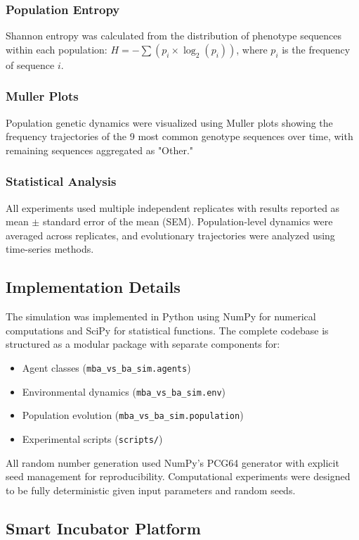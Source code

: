 \documentclass[aps,pre,twocolumn,floatfix,nofootinbib,amsmath,amssymb]{revtex4-2}
\begin{document}
\subsubsection{Population Entropy}
Shannon entropy was calculated from the distribution of phenotype sequences within each population: $H = -\sum(p_i \times \log_2(p_i))$, where $p_i$ is the frequency of sequence $i$.

\subsubsection{Muller Plots}
Population genetic dynamics were visualized using Muller plots showing the frequency trajectories of the 9 most common genotype sequences over time, with remaining sequences aggregated as "Other."

\subsubsection{Statistical Analysis}
All experiments used multiple independent replicates with results reported as mean $\pm$ standard error of the mean (SEM). Population-level dynamics were averaged across replicates, and evolutionary trajectories were analyzed using time-series methods.

\subsection{Implementation Details}

The simulation was implemented in Python using NumPy for numerical computations and SciPy for statistical functions. The complete codebase is structured as a modular package with separate components for:
\begin{itemize}
\item Agent classes (\texttt{mba\_vs\_ba\_sim.agents})
\item Environmental dynamics (\texttt{mba\_vs\_ba\_sim.env})
\item Population evolution (\texttt{mba\_vs\_ba\_sim.population})
\item Experimental scripts (\texttt{scripts/})
\end{itemize}

All random number generation used NumPy's PCG64 generator with explicit seed management for reproducibility. Computational experiments were designed to be fully deterministic given input parameters and random seeds.

\subsection{Smart Incubator Platform }
\end{document}
